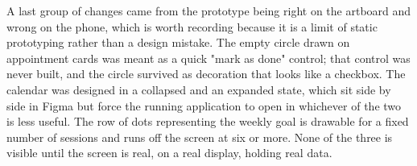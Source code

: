 A last group of changes came from the prototype being right on the artboard and wrong on the phone, which is worth recording because it is a limit of static prototyping rather than a design mistake. The empty circle drawn on appointment cards was meant as a quick "mark as done" control; that control was never built, and the circle survived as decoration that looks like a checkbox. The calendar was designed in a collapsed and an expanded state, which sit side by side in Figma but force the running application to open in whichever of the two is less useful. The row of dots representing the weekly goal is drawable for a fixed number of sessions and runs off the screen at six or more. None of the three is visible until the screen is real, on a real display, holding real data.
